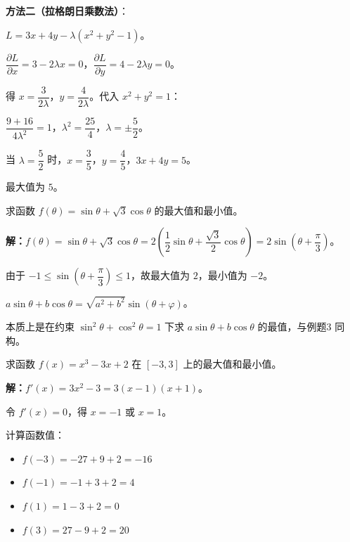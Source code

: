 \documentclass[12pt, a4paper]{ctexart}
\begin{document}
\textbf{方法二（拉格朗日乘数法）}：

$L = 3x + 4y - \lambda(x^2 + y^2 - 1)$。

$\dfrac{\partial L}{\partial x} = 3 - 2\lambda x = 0$，$\dfrac{\partial L}{\partial y} = 4 - 2\lambda y = 0$。

得 $x = \dfrac{3}{2\lambda}$，$y = \dfrac{4}{2\lambda}$。代入 $x^2 + y^2 = 1$：

$\dfrac{9 + 16}{4\lambda^2} = 1$，$\lambda^2 = \dfrac{25}{4}$，$\lambda = \pm\dfrac{5}{2}$。

当 $\lambda = \dfrac{5}{2}$ 时，$x = \dfrac{3}{5}$，$y = \dfrac{4}{5}$，$3x + 4y = 5$。

最大值为 $\boxed{5}$。

\begin{examplebox}[【例题4】三角函数最值]
求函数 $f(\theta) = \sin\theta + \sqrt{3}\cos\theta$ 的最大值和最小值。
\end{examplebox}

\textbf{解：}$f(\theta) = \sin\theta + \sqrt{3}\cos\theta = 2\left(\dfrac{1}{2}\sin\theta + \dfrac{\sqrt{3}}{2}\cos\theta\right) = 2\sin\!\left(\theta + \dfrac{\pi}{3}\right)$。

由于 $-1 \le \sin\!\left(\theta + \dfrac{\pi}{3}\right) \le 1$，故最大值为 $\boxed{2}$，最小值为 $\boxed{-2}$。

\begin{tipbox}[辅助角公式的优化视角]
$a\sin\theta + b\cos\theta = \sqrt{a^2+b^2}\sin(\theta + \varphi)$。

本质上是在约束 $\sin^2\theta + \cos^2\theta = 1$ 下求 $a\sin\theta + b\cos\theta$ 的最值，与例题3 同构。
\end{tipbox}

\begin{examplebox}[【例题5】导数法求最值]
求函数 $f(x) = x^3 - 3x + 2$ 在 $[-3, 3]$ 上的最大值和最小值。
\end{examplebox}

\textbf{解：}$f'(x) = 3x^2 - 3 = 3(x-1)(x+1)$。

令 $f'(x) = 0$，得 $x = -1$ 或 $x = 1$。

计算函数值：
\begin{itemize}
  \item $f(-3) = -27 + 9 + 2 = -16$
  \item $f(-1) = -1 + 3 + 2 = 4$
  \item $f(1) = 1 - 3 + 2 = 0$
  \item $f(3) = 27 - 9 + 2 = 20$
\end{itemize}
\end{document}

